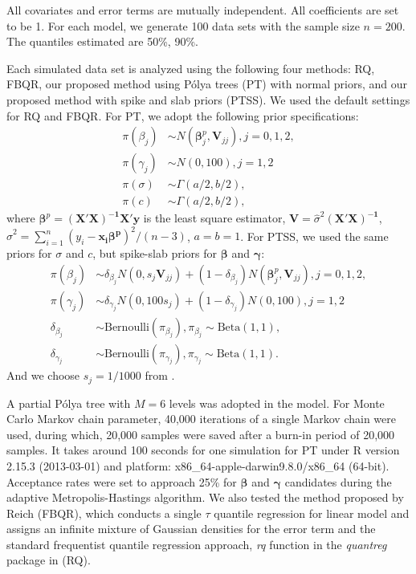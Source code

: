 \documentclass[12pt]{article}
\newcommand{\polya}{P\'{o}lya}
\begin{document}
All covariates and error terms are mutually independent. All
coefficients are set to be 1. For each model, we generate 100 data
sets with the sample size $n=200$. The quantiles estimated are 50\%,
90\%.

Each simulated data set is analyzed using the following four methods:
RQ, FBQR, our proposed method using \polya{} trees (PT) with normal
priors, and our proposed method with spike and slab priors (PTSS).  We
used the default settings for RQ and FBQR.  For PT, we adopt the
following prior specifications:
\begin{align*}
  \pi(\beta_j) & \sim N(\bm \beta_j^p, \bm V_{jj}) , j = 0, 1, 2,\\
  \pi(\gamma_j) & \sim N(0, 100), j = 1, 2\\
  \pi(\sigma) & \sim \Gamma (a/2, b/2), \\
  \pi(c) & \sim \Gamma(a/2, b/2),
\end{align*}
where $\bm \beta^p = \bm{(X'X)^{-1}X'y}$ is the least square
estimator, $\bm V = \hat{\sigma}^2\bm{(X'X)^{-1}}$, $\hat{\sigma}^2 =
\sum_{i = 1}^n (y_i - \bm {x_i \beta^p})^2/ (n - 3)$, $a = b = 1$.
For PTSS, we used the same priors for $\sigma$ and $c$, but spike-slab
priors for $\bm \beta$ and $\bm \gamma$:
\begin{align*}
  \pi(\beta_j) & \sim \delta_{\beta_j}N(0, s_j\bm V_{jj}) +  (1 - \delta_{\beta_j})N(\bm \beta_j^p, \bm V_{jj}) , j = 0, 1, 2,\\
  \pi(\gamma_j) & \sim \delta_{\gamma_j}N(0, 100s_j) + (1 - \delta_{\gamma_j}) N(0, 100), j = 1, 2\\
  \delta_{\beta_j} & \sim \text{Bernoulli}(\pi_{\beta_j}) , \pi_{\beta_j} \sim \text{Beta}(1, 1),\\
  \delta_{\gamma_j} & \sim \text{Bernoulli}(\pi_{\gamma_j}),
  \pi_{\gamma_j} \sim \text{Beta}(1, 1).
\end{align*}
And we choose $s_j = 1/1000$ from \cite{george1993}.

A partial \polya{} tree with $M=6$ levels was adopted in the
model. For Monte Carlo Markov chain parameter, 40,000 iterations of a
single Markov chain were used, during which, 20,000 samples were saved
 after a burn-in period of 20,000 samples.  It
takes around 100 seconds for one simulation for PT under R version 2.15.3
(2013-03-01) and platform: x86\_64-apple-darwin9.8.0/x86\_64
(64-bit). Acceptance rates were set to approach 25\% for $\bm{\beta}$
and $\bm{\gamma}$ candidates during the adaptive Metropolis-Hastings
algorithm.  We also tested the method proposed by Reich (FBQR), which
conducts a single $\tau$ quantile regression for linear model and
assigns an infinite mixture of Gaussian densities for the error term
and the standard frequentist quantile regression approach, \textit{rq}
function in the \textit{quantreg} package \citep{quantreg} in \cite{R}
(RQ).
\end{document}

